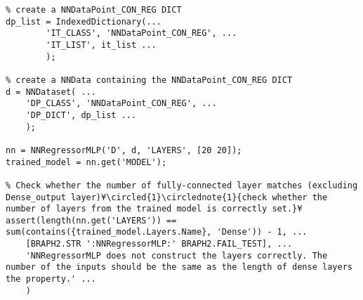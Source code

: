 \documentclass{tufte-handout}
\begin{document}
\begin{lstlisting}
% create a NNDataPoint_CON_REG DICT
dp_list = IndexedDictionary(...
        'IT_CLASS', 'NNDataPoint_CON_REG', ...
        'IT_LIST', it_list ...
        );

% create a NNData containing the NNDataPoint_CON_REG DICT
d = NNDataset( ...
    'DP_CLASS', 'NNDataPoint_CON_REG', ...
    'DP_DICT', dp_list ...
    );

nn = NNRegressorMLP('D', d, 'LAYERS', [20 20]);
trained_model = nn.get('MODEL');

% Check whether the number of fully-connected layer matches (excluding Dense_output layer)¥\circled{1}\circlednote{1}{check whether the number of layers from the trained model is correctly set.}¥
assert(length(nn.get('LAYERS')) == sum(contains({trained_model.Layers.Name}, 'Dense')) - 1, ...
    [BRAPH2.STR ':NNRegressorMLP:' BRAPH2.FAIL_TEST], ...
    'NNRegressorMLP does not construct the layers correctly. The number of the inputs should be the same as the length of dense layers the property.' ...
    )

\end{lstlisting}

%
%
\end{document}
